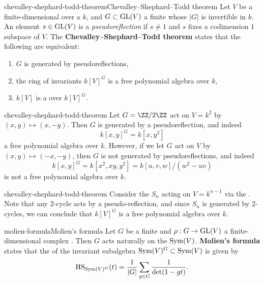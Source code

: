 \begin{topic}{chevalley-shephard-todd-theorem}{Chevalley--Shephard--Todd theorem}
    Let $V$ be a finite-dimensional  over a  $k$, and $G \subset \textup{GL}(V)$ a finite  whose  $|G|$ is invertible in $k$. An element $s \in \textup{GL}(V)$ is a \textit{pseudoreflection} if $s \ne 1$ and $s$ fixes a codimension $1$ subspace of $V$. The \textbf{Chevalley--Shephard--Todd theorem} states that the following are equivalent:
    \begin{enumerate}[label=(\roman*)]
        \item $G$ is generated by pseudoreflections,
        \item the ring of invariants $k[V]^G$ is a free polynomial algebra over $k$,
        \item $k[V]$ is a  over $k[V]^G$.
    \end{enumerate}
\end{topic}

\begin{example}{chevalley-shephard-todd-theorem}
    Let $G = \ZZ/2\ZZ$ act on $V = k^2$ by $(x, y) \mapsto (x, -y)$. Then $G$ is generated by a pseudoreflection, and indeed
    \[ k[x, y]^G = k[x, y^2] \]
    a free polynomial algebra over $k$. However, if we let $G$ act on $V$ by $(x, y) \mapsto (-x, -y)$, then $G$ is not generated by pseudoreflections, and indeed
    \[ k[x, y]^G = k[x^2, xy, y^2] = k[u, v, w] / (w^2 - uv) \]
    is not a free polynomial algebra over $k$.
\end{example}

\begin{example}{chevalley-shephard-todd-theorem}
    Consider the  $S_n$ acting on $V = k^{n - 1}$ via the . Note that any $2$-cycle acts by a pseudo-reflection, and since $S_n$ is generated by $2$-cycles, we can conclude that $k[V]^G$ is a free polynomial algebra over $k$.
\end{example}

\begin{topic}{molien-formula}{Molien's formula}
    Let $G$ be a finite  and $\rho : G \to \textup{GL}(V)$ a finite-dimensional complex . Then $G$ acts naturally on the  $\textup{Sym}(V)$. \textbf{Molien's formula} states that the  of the invariant subalgebra $\textup{Sym}(V)^G \subset \textup{Sym}(V)$ is given by
    \[ \textup{HS}_{\textup{Sym}(V)^G}(t) = \frac{1}{|G|} \sum_{g \in G} \frac{1}{\det(1 - gt)} . \]
\end{topic}


